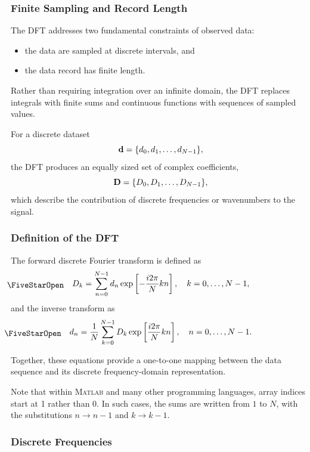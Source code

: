 \subsubsection*{Finite Sampling and Record Length}

The DFT addresses two fundamental constraints of observed data:
\begin{itemize}
    \item the data are sampled at discrete intervals, and
    \item the data record has finite length.
\end{itemize}

Rather than requiring integration over an infinite domain, the DFT replaces integrals with finite sums and continuous functions with sequences of sampled values.

For a discrete dataset
\[
    \vb{d} = \{d_0, d_1, \ldots, d_{N-1}\},
\]
the DFT produces an equally sized set of complex coefficients,
\[
    \vb{D} = \{D_0, D_1, \ldots, D_{N-1}\},
\]
which describe the contribution of discrete frequencies or wavenumbers to the signal.

\subsubsection*{Definition of the DFT}

The forward discrete Fourier transform is defined as
\begin{equation}
    \workeq
    D_k = \sum_{n=0}^{N-1} d_n 
    \exp \left[-\frac{i 2 \pi}{N} k n\right],
    \quad k = 0, \ldots, N-1,
    \label{eq-dft}
\end{equation}
and the inverse transform as
\begin{equation}
    \workeq
    d_n = \frac{1}{N}\sum_{k=0}^{N-1} D_k 
    \exp \left[\frac{i 2 \pi}{N} k n\right],
    \quad n = 0, \ldots, N-1.
    \label{eq-idft}
\end{equation}

Together, these equations provide a one-to-one mapping between the data sequence and its discrete frequency-domain representation.

Note that within \textsc{Matlab} and many other programming languages, array indices start at 1 rather than 0. In such cases, the sums are written from $1$ to $N$, with the substitutions $n \rightarrow n-1$ and $k \rightarrow k-1$.

\subsubsection*{Discrete Frequencies}

